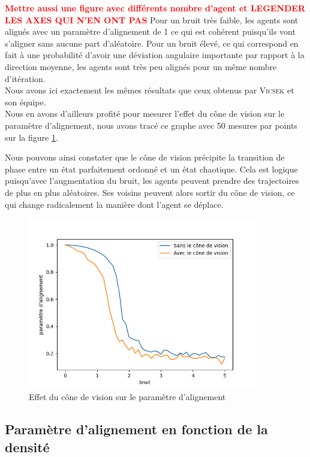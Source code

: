 \documentclass[french, a4paper, 12pt, openany]{report}
\begin{document}
	\textcolor{red}{\textbf{Mettre aussi une figure avec différents nombre d'agent et LEGENDER LES AXES QUI N'EN ONT PAS}}
	Pour un bruit très faible, les agents sont alignés avec un paramètre d'alignement de 1 ce qui est cohérent puisqu'ils vont s'aligner sans aucune part d'aléatoire. Pour un bruit élevé, ce qui correspond en fait à une probabilité d'avoir une déviation angulaire importante par rapport à la direction moyenne, les agents sont très peu alignés pour un même nombre d'itération. \\
	
	Nous avons ici exactement les mêmes résultats que ceux obtenus par \textsc{Vicsek} et son équipe.\\
	
	Nous en avons d'ailleurs profité pour mesurer l'effet du cône de vision sur le paramètre d'alignement, nous avons tracé ce graphe avec 50 mesures par points sur la figure \ref{cone_vision_alignement}. 
	
	Nous pouvons ainsi constater que le cône de vision précipite la transition de phase entre un état parfaitement ordonné et un état chaotique. Cela est logique puisqu'avec l'augmentation du bruit, les agents peuvent prendre des trajectoires de plus en plus aléatoires. Ses voisins peuvent alors sortir du cône de vision, ce qui change radicalement la manière dont l'agent se déplace.
	
	 \begin{figure}[!h]
		\centering
		\includegraphics[width=10cm]{images/bruit_comparaison[50 mesures par pts].png}
		\caption{Effet du cône de vision sur le paramètre d'alignement}
		\label{cone_vision_alignement}
	\end{figure}
    
    \subsection{Paramètre d'alignement en fonction de la densité}
\end{document}
